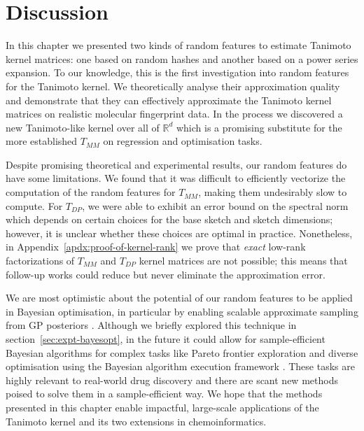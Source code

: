 \section{Discussion}\label{sec:trf:conclusion}

In this chapter we presented two kinds of random features to estimate Tanimoto kernel matrices:
one based on random hashes and another based on a power series expansion.
To our knowledge, this is the first investigation into random features for the Tanimoto kernel.
We theoretically analyse their approximation quality 
and demonstrate that they can effectively approximate the Tanimoto kernel matrices on
realistic molecular fingerprint data.
In the process we discovered a new Tanimoto-like kernel over all of $\mathbb{R}^d$
which is a promising substitute for the more established $T_{MM}$
on regression and optimisation tasks.

Despite promising theoretical and experimental results, 
our random features do have some limitations.
We found that it was difficult to efficiently vectorize the computation of the random features for $T_{MM}$,
making them undesirably slow to compute.
For $T_{DP}$, we were able to exhibit an error bound on the spectral norm which depends on certain choices for the base sketch and sketch dimensions; however, 
it is unclear whether these choices are optimal in practice.
Nonetheless,
in Appendix~\ref{apdx:proof-of-kernel-rank} we prove that \emph{exact} low-rank factorizations of $T_{MM}$ and $T_{DP}$ kernel matrices are not possible;
this means that follow-up works could reduce but never eliminate the approximation error.

We are most optimistic about the potential of our random features to be applied in Bayesian optimisation,
in particular by enabling scalable approximate sampling from GP posteriors \citep{wilson2020efficiently}.
Although we briefly explored this technique in section~\ref{sec:expt-bayesopt},
in the future it could allow for sample-efficient Bayesian algorithms for complex tasks like Pareto frontier exploration and 
diverse optimisation using the Bayesian algorithm execution framework \citep{neiswanger2021bayesian}.
These tasks are highly relevant to real-world drug discovery and there are scant new methods poised
to solve them in a sample-efficient way.
We hope that the methods presented in this chapter enable impactful, large-scale applications of the Tanimoto kernel and its two extensions in chemoinformatics.



